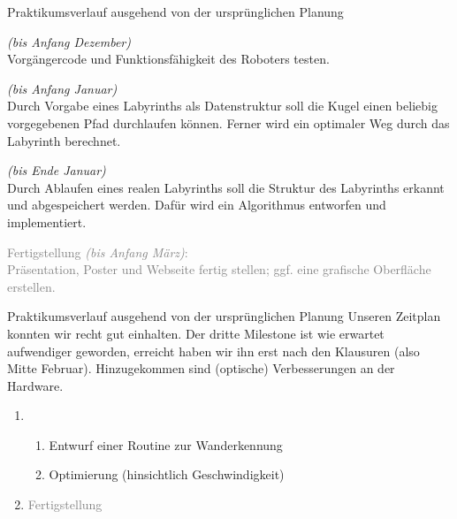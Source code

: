 \documentclass{beamer}
\begin{document}
\begin{frame}[fragile,t]{Praktikumsverlauf ausgehend von der ursprünglichen Planung}
\begin{enumerate}
    \item {} \textit{(bis Anfang Dezember)}\blue{:}\\
    Vorgängercode und Funktionsfähigkeit des Roboters testen.
    \item {} \textit{(bis Anfang Januar)}\blue{:}\\
    Durch Vorgabe eines Labyrinths als Datenstruktur soll die Kugel einen beliebig vorgegebenen Pfad durchlaufen können. Ferner wird ein optimaler Weg durch das Labyrinth berechnet.
    \item {} \textit{(bis Ende Januar)}\blue{:}\\
    Durch Ablaufen eines realen Labyrinths soll die Struktur des Labyrinths erkannt und abgespeichert werden. Dafür wird ein Algorithmus entworfen und implementiert.
    \textcolor{gray}{
    \item[\textcolor{gray}{4.}] Fertigstellung \textit{(bis Anfang März)}:\\
    Präsentation, Poster und Webseite fertig stellen; ggf. eine grafische Oberfläche erstellen.
}
\end{enumerate}
\end{frame}

\begin{frame}[fragile,t]{Praktikumsverlauf ausgehend von der ursprünglichen Planung}
Unseren Zeitplan konnten wir recht gut einhalten. Der dritte Milestone ist wie erwartet aufwendiger geworden, erreicht haben wir ihn erst nach den Klausuren (also Mitte Februar). Hinzugekommen sind (optische) Verbesserungen an der Hardware. 

\smallskip
\begin{enumerate}
	\item[3.] 
	\begin{enumerate}
	\item[(a)] Entwurf einer Routine zur Wanderkennung
	\item[(b)] Optimierung (hinsichtlich Geschwindigkeit)
	\end{enumerate}
    \item[\textcolor{gray}{4.}] \textcolor{gray}{Fertigstellung}
\end{enumerate}
\end{frame}
\end{document}
